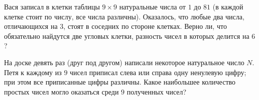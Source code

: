 Вася записал в клетки таблицы $9 \times 9$ натуральные числа от $1$ до $81$ (в каждой клетке стоит по числу, все числа различны). Оказалось, что любые два числа, отличающихся на $3$, стоят в соседних по стороне клетках. Верно ли, что обязательно найдутся две угловых клетки, разность чисел в которых делится на $6$?

На доске девять раз (друг под другом) написали некоторое натуральное число $N$. Петя к каждому из $9$ чисел приписал слева или справа одну ненулевую цифру; при этом все приписанные цифры различны. Какое наибольшее количество простых чисел могло оказаться среди $9$ полученных чисел?